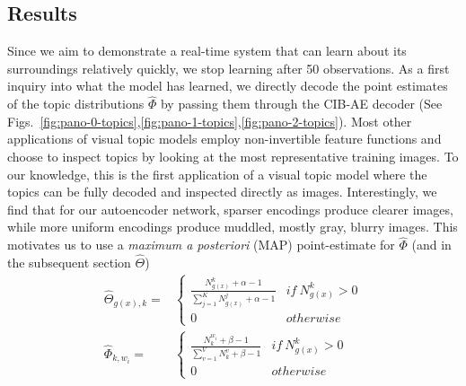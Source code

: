 \subsection{Results}

Since we aim to demonstrate a real-time system that can learn about its surroundings relatively quickly, we stop learning after 50 observations. As a first inquiry into what the model has learned, we directly decode the point estimates of the topic distributions $\hat{\Phi}$ by passing them through the CIB-AE decoder (See Figs.~\ref{fig:pano-0-topics},\ref{fig:pano-1-topics},\ref{fig:pano-2-topics}). Most other applications of visual topic models employ non-invertible feature functions and choose to inspect topics by looking at the most representative training images. To our knowledge, this is the first application of a visual topic model where the topics can be fully decoded and inspected directly as images. Interestingly, we find that for our autoencoder network, sparser encodings produce clearer images, while more uniform encodings produce muddled, mostly gray, blurry images. This motivates us to use a \emph{maximum a posteriori} (MAP) point-estimate for $\hat{\Phi}$ (and in the subsequent section $\hat{\Theta}$)
\begin{equation} \label{eqn:map_thetaphi}
\begin{split}
\hat{\Theta}_{g(x), k} =&
    \begin{cases}
        \frac{N^k_{g(x)} + \alpha - 1}{\sum_{j=1}^K N^j_{g(x)} + \alpha - 1} & if~N^k_{g(x)} > 0 \\
        0 & otherwise
    \end{cases} \\
\hat{\Phi}_{k, w_i} =&
    \begin{cases}
        \frac{N^{w_i}_k + \beta - 1}{\sum_{v=1}^V N^v_k + \beta - 1} & if~N^k_{g(x)} > 0 \\
        0 & otherwise
    \end{cases}
\end{split}
\end{equation}

